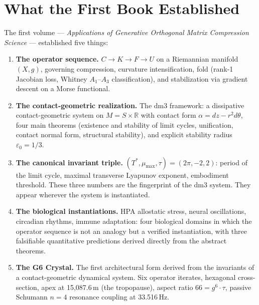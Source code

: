 \section{What the First Book Established}
\label{sec:book1}

The first volume --- \textit{Applications of Generative Orthogonal
Matrix Compression Science} --- established five things:

\begin{enumerate}

\item \textbf{The operator sequence.}
$C \to K \to F \to U$ on a Riemannian manifold $(X, g)$,
governing compression, curvature intensification, fold
(rank-1 Jacobian loss, Whitney $A_1$--$A_3$ classification),
and stabilization via gradient descent on a Morse functional.

\item \textbf{The contact-geometric realization.}
The dm3 framework: a dissipative contact-geometric system
on $M = S \times \mathbb{R}$ with contact form
$\alpha = dz - r^2 d\theta$, four main theorems
(existence and stability of limit cycles, unification,
contact normal form, structural stability), and explicit
stability radius $\varepsilon_0 = 1/3$.

\item \textbf{The canonical invariant triple.}
$(T^*, \mu_{\max}, \tau) = (2\pi, -2, 2)$: period of the
limit cycle, maximal transverse Lyapunov exponent, embodiment
threshold. These three numbers are the fingerprint of the
dm3 system. They appear wherever the system is instantiated.

\item \textbf{The biological instantiations.}
HPA allostatic stress, neural oscillations, circadian rhythms,
immune adaptation: four biological domains in which the operator
sequence is not an analogy but a verified instantiation, with
three falsifiable quantitative predictions derived directly
from the abstract theorems.

\item \textbf{The G6 Crystal.}
The first architectural form derived from the invariants of
a contact-geometric dynamical system. Six operator iterates,
hexagonal cross-section, apex at 15,087.6\,m (the tropopause),
aspect ratio $66 = g^6 \cdot \tau$, passive Schumann $n=4$
resonance coupling at 33.516\,Hz.

\end{enumerate}

